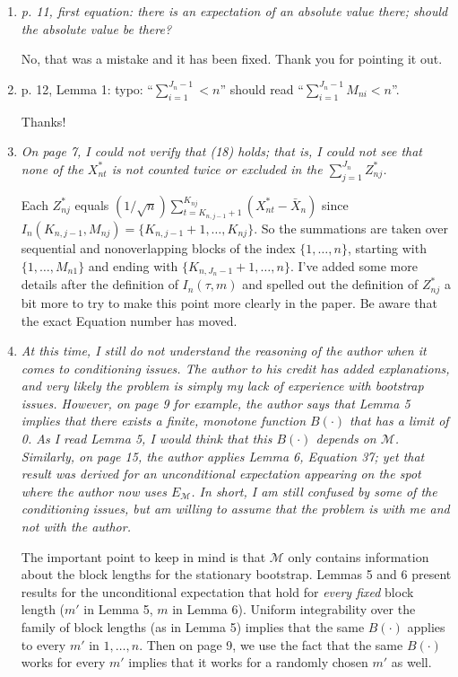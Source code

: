 \documentclass[12pt]{article}
\begin{document}
\begin{enumerate}
\item \textit{p. 11, first equation: there is an expectation of an
    absolute value there; should the absolute value be there?}

  No, that was a mistake and it has been fixed. Thank you for pointing
  it out.

\item p. 12, Lemma 1: typo: ``$\sum_{i=1}^{J_n-1} < n$'' should read
  ``$\sum_{i=1}^{J_n-1} M_{ni} < n$''.

  Thanks!

\item \textit{On page 7, I could not verify that (18) holds; that is,
    I could not see that none of the $X_{nt}^*$ is not counted twice
    or excluded in the $\sum_{j=1}^{J_n} Z_{nj}^*$.}

  Each $Z_{nj}^*$ equals $(1/\sqrt{n}) \sum_{t=K_{n,j-1}+1}^{K_{nj}}
  (X_{nt}^* - \bar X_n)$ since $I_n(K_{n,j-1}, M_{nj}) =
  \{K_{n,j-1}+1,\dots,K_{nj}\}$. So the summations are taken over
  sequential and nonoverlapping blocks of the index $\{1,\dots,n\}$,
  starting with $\{1,\dots,M_{n1}\}$ and ending with
  $\{K_{n,J_n-1}+1,\dots,n\}$.  I've added some more details after the
  definition of $I_n(\tau,m)$ and spelled out the
  definition of $Z_{nj}^*$ a bit more to try to make
  this point more clearly in the paper. Be aware that the exact
  Equation number has moved.

\item \textit{At this time, I still do not understand the reasoning of
    the author when it comes to conditioning issues. The author to his
    credit has added explanations, and very likely the problem is
    simply my lack of experience with bootstrap issues. However, on
    page 9 for example, the author says that Lemma 5 implies that
    there exists a finite, monotone function $B(\cdot)$ that has a
    limit of 0. As I read Lemma 5, I would think that this $B(\cdot)$
    depends on $\mathcal{M}$. Similarly, on page 15, the author
    applies Lemma 6, Equation 37; yet that result was derived for an
    unconditional expectation appearing on the spot where the author
    now uses $E_{\mathcal{M}}$. In short, I am still confused by some
    of the conditioning issues, but am willing to assume that the
    problem is with me and not with the author.}

  The important point to keep in mind is that $\mathcal{M}$ only
  contains information about the block lengths for the stationary
  bootstrap. Lemmas 5 and 6 present results for the unconditional
  expectation that hold for \emph{every fixed} block length ($m'$ in
  Lemma 5, $m$ in Lemma 6). Uniform integrability over the family of
  block lengths (as in Lemma 5) implies that the same $B(\cdot)$
  applies to every $m'$ in $1,\dots,n$. Then on page 9, we use the
  fact that the same $B(\cdot)$ works for every $m'$ implies that it
  works for a randomly chosen $m'$ as well.


\end{enumerate}
\end{document}
